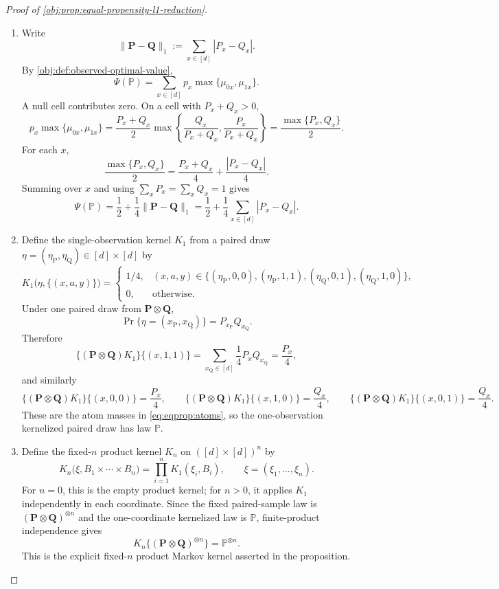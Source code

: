 \begin{proof}[Proof of \cref{obj:prop:equal-propensity-l1-reduction}]
\begin{enumerate}
\item Write
\[
\|\mathbf P-\mathbf Q\|_1:=\sum_{x\in[d]}|P_x-Q_x|.
\]
By \cref{obj:def:observed-optimal-value},
\[
\Psi(\mathbb P)
=
\sum_{x\in[d]}p_x\max\{\mu_{0x},\mu_{1x}\}.
\]
A null cell contributes zero. On a cell with \(P_x+Q_x>0\),
\[
p_x\max\{\mu_{0x},\mu_{1x}\}
=
\frac{P_x+Q_x}{2}
\max\left\{\frac{Q_x}{P_x+Q_x},\frac{P_x}{P_x+Q_x}\right\}
=
\frac{\max\{P_x,Q_x\}}2.
\]
For each \(x\),
\[
\frac{\max\{P_x,Q_x\}}2
=
\frac{P_x+Q_x}{4}+\frac{|P_x-Q_x|}{4}.
\]
Summing over \(x\) and using \(\sum_xP_x=\sum_xQ_x=1\) gives
\begin{equation}
\label{eq:eqprop:value}
\Psi(\mathbb P)
=
\frac12+\frac14\|\mathbf P-\mathbf Q\|_1
=
\frac12+\frac14\sum_{x\in[d]}|P_x-Q_x|.
\end{equation} %

\item Define the single-observation kernel \(K_1\) from a paired draw
\(\eta=(\eta_{\mathrm P},\eta_{\mathrm Q})\in[d]\times[d]\) by
\[
K_1\bigl(\eta,\{(x,a,y)\}\bigr)
=
\begin{cases}
1/4,& (x,a,y)\in
\{(\eta_{\mathrm P},0,0),(\eta_{\mathrm P},1,1),
  (\eta_{\mathrm Q},0,1),(\eta_{\mathrm Q},1,0)\},\\
0,& \text{otherwise}.
\end{cases}
\]
Under one paired draw from \(\mathbf P\otimes\mathbf Q\),
\[
\Pr\{\eta=(x_{\mathrm P},x_{\mathrm Q})\}=P_{x_{\mathrm P}}Q_{x_{\mathrm Q}}.
\]
Therefore
\[
\{(\mathbf P\otimes\mathbf Q)K_1\}\{(x,1,1)\}
=
\sum_{x_{\mathrm Q}\in[d]}\frac14P_xQ_{x_{\mathrm Q}}
=
\frac{P_x}{4},
\]
and similarly
\[
\{(\mathbf P\otimes\mathbf Q)K_1\}\{(x,0,0)\}=\frac{P_x}{4},
\qquad
\{(\mathbf P\otimes\mathbf Q)K_1\}\{(x,1,0)\}=\frac{Q_x}{4},
\qquad
\{(\mathbf P\otimes\mathbf Q)K_1\}\{(x,0,1)\}=\frac{Q_x}{4}.
\]
These are the atom masses in \cref{eq:eqprop:atoms}, so the one-observation kernelized paired
draw has law \(\mathbb P\). %

\item Define the fixed-\(n\) product kernel \(K_n\) on \(([d]\times[d])^n\) by
\[
K_n\bigl(\xi,B_1\times\cdots\times B_n\bigr)
=
\prod_{i=1}^n K_1(\xi_i,B_i),
\qquad
\xi=(\xi_1,\ldots,\xi_n).
\]
For \(n=0\), this is the empty product kernel; for \(n>0\), it applies \(K_1\) independently in
each coordinate. Since the fixed paired-sample law is \((\mathbf P\otimes\mathbf Q)^{\otimes n}\)
and the one-coordinate kernelized law is \(\mathbb P\), finite-product independence gives
\begin{equation}
\label{eq:eqprop:product-kernel}
K_n\{(\mathbf P\otimes\mathbf Q)^{\otimes n}\}
=
\mathbb P^{\otimes n}.
\end{equation}
This is the explicit fixed-\(n\) product Markov kernel asserted in the proposition. %


\end{enumerate}
\end{proof}
